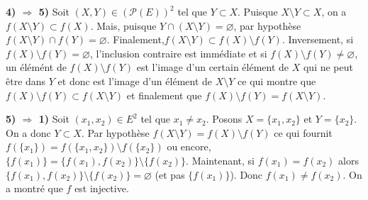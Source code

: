{\begin{enumerate}
{\textbf{4) $\Rightarrow$ 5)} Soit $(X,Y)\in(\mathcal{P}(E))^2$ tel que $Y\subset X$.
Puisque $X\setminus Y\subset X$, on a $f(X\setminus Y)\subset f(X)$. Mais, puisque $Y\cap(X\setminus Y)=\varnothing$, par
hypothèse $f(X\setminus Y)\cap f(Y)=\varnothing$. Finalement,$f(X\setminus Y)\subset f(X)\setminus f(Y)$.
Inversement, si $f(X)\setminus f(Y)=\varnothing$, l'inclusion contraire est immédiate et si $f(X)\setminus
f(Y)\neq\varnothing$, un élémént de $f(X)\setminus f(Y)$ est l'image d'un certain élément de $X$ qui ne peut être dans $Y$
et donc est l'image d'un élément de $X\setminus Y$ ce qui montre que $f(X)\setminus f(Y)\subset f(X\setminus Y)$ et
finalement que $f(X)\setminus f(Y)=f(X\setminus Y)$.

\textbf{5) $\Rightarrow$ 1)} Soit $(x_1,x_2)\in E^2$ tel que $x_1\neq x_2$. Posons $X=\{x_1,x_2\}$ et $Y=\{x_2\}$.
On a
donc $Y\subset X$. Par hypothèse $f(X\setminus Y)=f(X)\setminus f(Y)$ ce qui fournit
$f(\{x_1\})=f(\{x_1,x_2\})\setminus f(\{x_2\})$ ou encore, $\{f(x_1)\}=\{f(x_1),f(x_2)\}\setminus\{f(x_2)\}$.
Maintenant, si $f(x_1)=f(x_2)$ alors $\{f(x_1),f(x_2)\}\setminus\{f(x_2)\}=\varnothing$ (et pas $\{f(x_1)\}$). Donc
$f(x_1)\neq f(x_2)$.
On a montré que $f$ est injective.
}
\end{enumerate}
}
